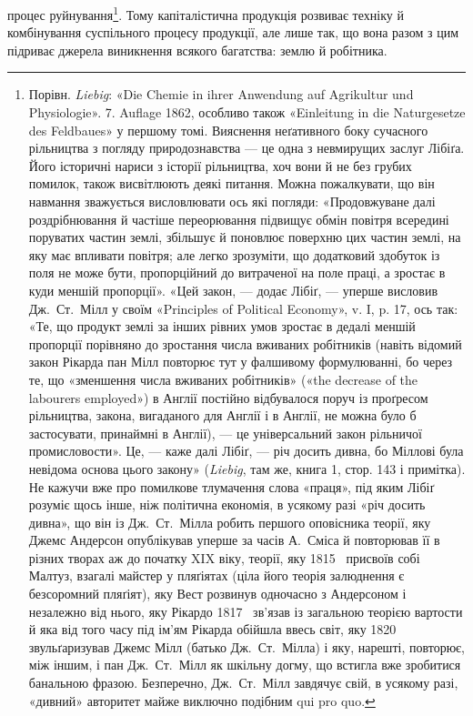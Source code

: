процес руйнування\footnote{
Порівн. \emph{Liebig}: «Die Chemie in ihrer Anwendung auf Agrikultur
und Physiologie». 7. Auflage 1862, особливо також «Einleitung
in die Naturgesetze des Feldbaues» у першому томі. Вияснення неґативного
боку сучасного рільництва з погляду природознавства — це одна
з невмирущих заслуг Лібіґа. Його історичні нариси з історії рільництва,
хоч вони й не без грубих помилок, також висвітлюють деякі питання.
Можна пожалкувати, що він навмання зважується висловлювати
ось які погляди: «Продовжуване далі роздрібнювання й частіше переорювання
підвищує обмін повітря всередині поруватих частин землі, збільшує
й поновлює поверхню цих частин землі, на яку має впливати повітря;
але легко зрозуміти, що додатковий здобуток із поля не може бути,
пропорційний до витраченої на поле праці, а зростає в куди меншій пропорції».
«Цей закон, — додає Лібіґ, — уперше висловив Дж.~Ст.~Мілл у своїм
«Principles of Political Economy», v. I, p. 17, ось так: «Те, що продукт
землі за інших рівних умов зростає в дедалі меншій пропорції порівняно
до зростання числа вживаних робітників (навіть відомий закон Рікарда
пан Мілл повторює тут у фалшивому формулюванні, бо через те, що «зменшення
числа вживаних робітників» («the decrease of the labourers employed»)
в Англії постійно відбувалося поруч із проґресом рільництва, закона,
вигаданого для Англії і в Англії, не можна було б застосувати, принаймні
в Англії), — це універсальний закон рільничої промисловости». Це, — каже
далі Лібіґ, — річ досить дивна, бо Міллові була невідома основа цього закону»
(\emph{Liebig}, там же, книга 1, стор. 143 і примітка). Не кажучи вже про
помилкове тлумачення слова «праця», під яким Лібіґ розуміє щось інше,
ніж політична економія, в усякому разі «річ досить дивна», що він із Дж.~Ст.~Мілла робить першого оповісника теорії, яку Джемс Андерсон опублікував
уперше за часів А.~Сміса й повторював її в різних творах аж до
початку XIX віку, теорії, яку 1815~ присвоїв собі Малтуз, взагалі
майстер у пляґіятах (ціла його теорія залюднення є безсоромний пляґіят),
яку Вест розвинув одночасно з Андерсоном і незалежно від нього,
яку Рікардо 1817~ зв’язав із загальною теорією вартости й яка від
того часу під ім’ям Рікарда обійшла ввесь світ, яку 1820~ звульґаризував
Джемс Мілл (батько Дж.~Ст.~Мілла) і яку, нарешті, повторює, між
іншим, і пан Дж.~Ст.~Мілл як шкільну догму, що встигла вже зробитися
банальною фразою. Безперечно, Дж.~Ст.~Мілл завдячує свій, в усякому
разі, «дивний» авторитет майже виключно подібним qui pro quo.
}. Тому капіталістична продукція розвиває
техніку й комбінування суспільного процесу продукції, але
лише так, що вона разом з цим підриває джерела виникнення
всякого багатства: землю й робітника.


